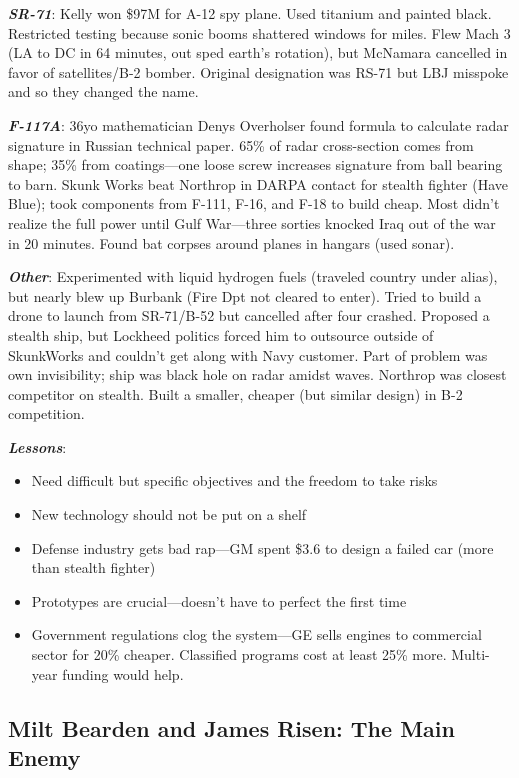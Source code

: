 \documentclass[
]{article}
\begin{document}
\textbf{\emph{SR-71}}: Kelly won \$97M for A-12 spy plane. Used titanium
and painted black. Restricted testing because sonic booms shattered
windows for miles. Flew Mach 3 (LA to DC in 64 minutes, out sped earth's
rotation), but McNamara cancelled in favor of satellites/B-2 bomber.
Original designation was RS-71 but LBJ misspoke and so they changed the
name.

\textbf{\emph{F-117A}}: 36yo mathematician Denys Overholser found
formula to calculate radar signature in Russian technical paper. 65\% of
radar cross-section comes from shape; 35\% from coatings---one loose
screw increases signature from ball bearing to barn. Skunk Works beat
Northrop in DARPA contact for stealth fighter (Have Blue); took
components from F-111, F-16, and F-18 to build cheap. Most didn't
realize the full power until Gulf War---three sorties knocked Iraq out
of the war in 20 minutes. Found bat corpses around planes in hangars
(used sonar).

\textbf{\emph{Other}}: Experimented with liquid hydrogen fuels (traveled
country under alias), but nearly blew up Burbank (Fire Dpt not cleared
to enter). Tried to build a drone to launch from SR-71/B-52 but
cancelled after four crashed. Proposed a stealth ship, but Lockheed
politics forced him to outsource outside of SkunkWorks and couldn't get
along with Navy customer. Part of problem was own invisibility; ship was
black hole on radar amidst waves. Northrop was closest competitor on
stealth. Built a smaller, cheaper (but similar design) in B-2
competition.

\textbf{\emph{Lessons}}:

\begin{itemize}
\item
  Need difficult but specific objectives and the freedom to take risks
\item
  New technology should not be put on a shelf
\item
  Defense industry gets bad rap---GM spent \$3.6 to design a failed car
  (more than stealth fighter)
\item
  Prototypes are crucial---doesn't have to perfect the first time
\item
  Government regulations clog the system---GE sells engines to
  commercial sector for 20\% cheaper. Classified programs cost at least
  25\% more. Multi-year funding would help.
\end{itemize}

\hypertarget{milt-bearden-and-james-risen-the-main-enemy}{%
\subsection{Milt Bearden and James Risen: The Main
Enemy}\label{milt-bearden-and-james-risen-the-main-enemy}}
\end{document}

